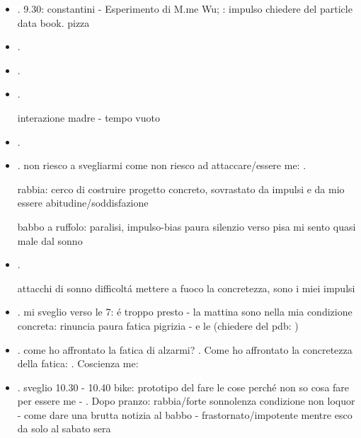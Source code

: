 \begin{itemize}
\item {}.
9.30: constantini - Esperimento di M.me Wu; : impulso chiedere del particle data book. pizza 

\item {}.

\item {}.

\item {}.

interazione madre - tempo vuoto

\item {}.

\item {}.
non riesco a svegliarmi come non riesco ad attaccare/essere me: .

rabbia: cerco di costruire progetto concreto, sovrastato da impulsi e da mio essere abitudine/soddisfazione

babbo a ruffolo: paralisi, impulso-bias paura silenzio
verso pisa mi sento quasi male dal sonno

\item {}.

attacchi di sonno
difficolt\'a mettere a fuoco la concretezza, sono i miei impulsi

\item {}.
mi sveglio verso le 7: \'e troppo presto - la mattina sono nella mia condizione concreta: rinuncia paura fatica pigrizia -  e le 
(chiedere del pdb: )

\item {}.
come ho affrontato la fatica di alzarmi? . Come ho affrontato la concretezza della fatica: . Coscienza me: 

\item {}.
sveglio 10.30 - 10.40 bike: prototipo del fare le cose perch\'e non so cosa fare per essere me - .
Dopo pranzo: rabbia/forte sonnolenza
condizione non loquor - come dare una brutta notizia al babbo  - frastornato/impotente mentre esco da solo al sabato sera


\end{itemize}
